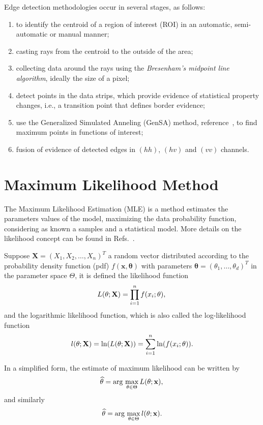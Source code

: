 \documentclass[conference]{IEEEtran}
\begin{document}
Edge detection methodologies occur in several stages, as follows:
\begin{enumerate}
	\item to identify the centroid of a region of interest (ROI) in an automatic, semi-automatic or manual manner;
	\item casting rays from the centroid to the outside of the area;
	\item collecting data around the rays using the {\it Bresenham's midpoint line algorithm}, ideally the size of a pixel;
	\item detect points in the data strips, which provide evidence of statistical property changes, i.e., a transition point that defines border evidence;
	\item use the Generalized Simulated Anneling (GenSA) method, reference~\cite{xgsh}, to find maximum points in functions of interest;
	\item fusion of evidence of detected edges in $(hh)$, $(hv)$ and $(vv)$ channels.
\end{enumerate}

\section{Maximum Likelihood Method}\label{sec_05}
The Maximum Likelihood Estimation (MLE) is a method estimates the parameters values of the model, maximizing the data probability function, considering as known a samples and a statistical model. More details on the likelihood concept can be found in Refs.~\cite{nhfc, gmbf}.

Suppose $\mathbf{X}=(X_1,X_2,\dots,X_n)^T$ a random vector distributed according to the probability density function (pdf) $f(\mathbf{x},\mathbf{\theta})$ with parameters $\mathbf{\theta}=(\theta_1,\dots,\theta_d)^T$ in the parameter space $\Theta$, it is defined the likelihood function  
\begin{equation*}
    L(\theta;\mathbf{X}) = \prod_{i=1}^{n}f(x_i;\theta), \\
\end{equation*}
and the logarithmic likelihood function, which is also called the log-likelihood function
\begin{equation}\label{eq_09}
	l(\theta;\mathbf{X})= \ln(L(\theta;\mathbf{X})) = \sum_{i=1}^{n}\ln(f(x_i;\theta)). \\
\end{equation}

In a simplified form, the estimate of maximum likelihood can be written by 
\begin{equation*}
    \widehat{\theta}= \text{arg}\,\max\limits_{\theta\in\Theta}L(\theta;\mathbf{x}),\\
\end{equation*}
and similarly
\begin{equation*}
    \widehat{\theta}= \text{arg}\,\max\limits_{\theta\in\Theta}l(\theta;\mathbf{x}).\\
\end{equation*}
\end{document}

